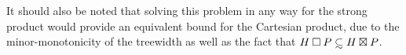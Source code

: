 \documentclass[../main.tex]{subfiles}
\begin{document}
	It should also be noted that solving this problem in any way for the strong product would provide an equivalent bound for the Cartesian product, due to the minor-monotonicity of the treewidth as well as the fact that $H\boxprod P \subsetsim H\boxtimes P$. 
	
	
	
\end{document}
